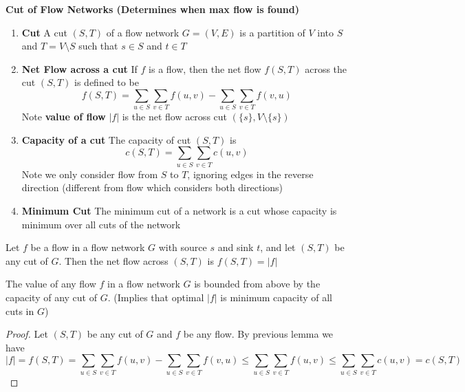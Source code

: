 \documentclass[11pt]{article}
\begin{document}
\begin{defn*}
    \textbf{Cut of Flow Networks (Determines when max flow is found)} 
    \begin{enumerate}
        \item \textbf{Cut} A cut $(S,T)$ of a flow network $G = (V,E)$ is a partition of $V$ into $S$ and $T = V \setminus S$ such that $s\in S$ and $t\in T$
        \item \textbf{Net Flow across a cut} If $f$ is a flow, then the net flow $f(S,T)$ across the cut $(S,T)$ is defined to be 
        \[
            f(S,T) = \sum_{u\in S} \sum_{v\in T} f(u,v) - \sum_{u\in S}\sum_{v\in T} f(v,u)
        \]
        Note \textbf{value of flow} $|f|$ is the net flow across cut $(\{s\}, V\setminus \{s\})$
        \item \textbf{Capacity of a cut} The capacity of cut $(S,T)$ is 
        \[
            c(S,T) = \sum_{u\in S} \sum_{v\in T} c(u,v)
        \]
        Note we only consider flow from $S$ to $T$, ignoring edges in the reverse direction (different from flow which considers both directions)
        \item \textbf{Minimum Cut} The minimum cut of a network is a cut whose capacity is minimum over all cuts of the network
    \end{enumerate}
\end{defn*}

\begin{lemma*}
    Let $f$ be a flow in a flow network $G$ with source $s$ and sink $t$, and let $(S,T)$ be any cut of $G$. Then the net flow across $(S,T)$ is $f(S,T) = |f|$
\end{lemma*}

\begin{corollary*}
    The value of any flow $f$ in a flow network $G$ is bounded from above by the capacity of any cut of $G$. (Implies that optimal $|f|$ is minimum capacity of all cuts in $G$)
    \begin{proof}
        Let $(S,T)$ be any cut of $G$ and $f$ be any flow. By previous lemma we have 
        \[
            |f| = f(S,T) = \sum_{u\in S} \sum_{v\in T} f(u,v) - \sum_{u\in S}\sum_{v\in T} f(v,u) \leq \sum_{u\in S} \sum_{v\in T} f(u,v) \leq \sum_{u\in S} \sum_{v\in T} c(u,v) = c(S,T)
        \]
    \end{proof}
\end{corollary*}
\end{document}
